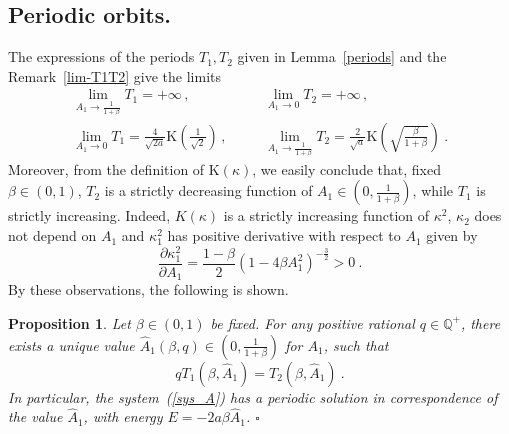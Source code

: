 \documentclass[a4paper]{article}
\newtheorem{proposition}{Proposition}
\begin{document}
\subsection{Periodic orbits.}
\label{per_orb}
The expressions of the periods $T_1,T_2$ given in Lemma~\ref{periods}
and the Remark~\ref{lim-T1T2} give the limits
\begin{equation}
\label{limits}
\begin{array}{rcl}
\lim_{A_1\rightarrow\frac{1}{1+\beta}}T_1= +\infty \,, 
&\quad&
\lim_{A_1 \rightarrow 0}T_2=+\infty \,, \nonumber
\\ 
\lim_{A_1\rightarrow 0}T_1=\frac{4}{\sqrt{2a}}{\mathrm{K}}(\frac{1}{\sqrt{2}}) \,,
&\quad &
\lim_{A_1\rightarrow\frac{1}{1+\beta}}T_2=\frac{2}{\sqrt{a}}
{\mathrm{K}}(\sqrt{\frac{\beta}{1+\beta}}) \ .
\end{array}
\end{equation}
Moreover, from the definition of ${\mathrm{K}}(\kappa)$, we easily conclude that, fixed 
$\beta \in (0,1)$, $T_2$ is a strictly decreasing function of 
$A_1 \in (0,\frac{1}{1+\beta})$, while $T_1$ is strictly increasing. 
Indeed, $K(\kappa)$ is a strictly increasing function of $\kappa^2$,
$\kappa_2$ does not depend on $A_1$ and $\kappa_1^2$ has positive 
derivative with respect to $A_1$ given by
\[
\frac{\partial \kappa_1^2}{\partial A_1} = 
\frac{1-\beta}{2}(1-4\beta A_1^2)^{-\frac{3}{2}} >0\ .
\]   
By these 
observations, the following is shown.
\begin{proposition}
  \label{periodic_orbits}
  Let $\beta \in (0,1)$ be fixed. For any positive rational $q \in {\mathbb{Q}}^+$, there 
  exists a unique value $\hat{A}_1(\beta,q) \in (0,\frac{1}{1+\beta})$ for 
  $A_1$, such that
  \begin{equation}
    \label{qT}
    qT_1(\beta,\hat{A}_1)=T_2(\beta,\hat{A}_1)\ . 
  \end{equation}
  In particular, the system~(\ref{sys_A}) has a periodic solution in 
  correspondence of the value $\hat{A}_1$, with energy 
  $E=-2 a \beta \hat{A}_1$. 
{$\square$\\}
\end{proposition}
\end{document}
